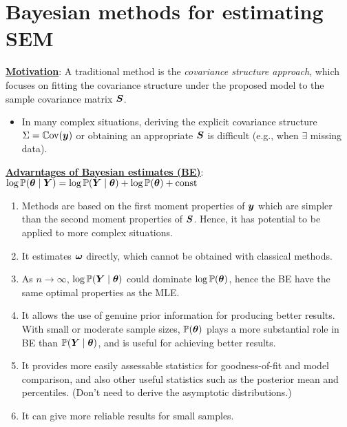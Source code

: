 \documentclass[10pt,a4paper]{book}
\begin{document}
\section{Bayesian methods for estimating SEM}\label{sec:Bayes_est_SEM}
\underline{\textbf{Motivation}}:
A traditional method is the \textit{covariance structure approach}, which focuses on fitting the covariance structure under the proposed model to the sample covariance matrix $\S$.
\begin{itemize}
	\item In many complex situations, deriving the explicit covariance structure $\Sigma=\Cov(\y)$ or obtaining an appropriate $\S$ is difficult (e.g., when $\exists$ missing data).
\end{itemize}
\underline{\textbf{Advarntages of Bayesian estimates (BE)}}: $\log\bbP(\baq\mid\Y)=\log\bbP(\Y\mid\baq)+\log\bbP(\baq)+\mathrm{const}$
\begin{enumerate}
	\item Methods are based on the first moment properties of $\y$ which are simpler than the second moment properties of $\S$. 
	Hence, it has potential to be applied to more complex situations.

	\item It estimates $\bao$ directly, which cannot be obtained with classical methods.
	
	\item As $n\to \infty$, $\log\bbP(\Y\mid\baq)$ could dominate $\log\bbP(\baq)$, hence the BE have the same optimal properties
	as the MLE. 

	\item It allows the use of genuine prior information for producing better results. 
	With small or moderate sample sizes, $\bbP(\baq)$ plays a more substantial role in BE than $\bbP(\Y\mid\baq)$, and is useful for achieving better results. 
	
	\item It provides more easily assessable statistics for goodness-of-fit and model comparison, and also other useful statistics such as the posterior mean and percentiles. (Don't need to derive the asymptotic distributions.)
	\item It can give more reliable results for small samples.
\end{enumerate}
\end{document}
